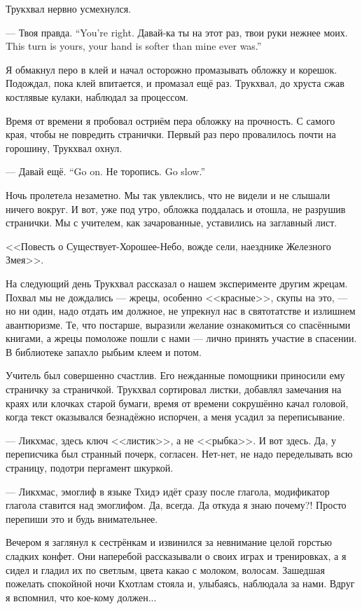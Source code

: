 Трукхвал нервно усмехнулся.

{--- Твоя правда.}
{``You're right.}
{Давай-ка ты на этот раз, твои руки нежнее моих.}
{This turn is yours, your hand is softer than mine ever was.''}

Я обмакнул перо в клей и начал осторожно промазывать обложку и корешок.
Подождал, пока клей впитается, и промазал ещё раз.
Трукхвал, до хруста сжав костлявые кулаки, наблюдал за процессом.

Время от времени я пробовал остриём пера обложку на прочность.
С самого края, чтобы не повредить странички.
Первый раз перо провалилось почти на горошину, Трукхвал охнул.

{--- Давай ещё.}
{``Go on.}
{Не торопись.}
{Go slow.''}

Ночь пролетела незаметно.
Мы так увлеклись, что не видели и не слышали ничего вокруг.
И вот, уже под утро, обложка поддалась и отошла, не разрушив странички.
Мы с учителем, как зачарованные, уставились на заглавный лист.

<<Повесть о Существует-Хорошее-Небо, вожде сели, наезднике Железного Змея>>.

\asterism

На следующий день Трукхвал рассказал о нашем эксперименте другим жрецам.
Похвал мы не дождались --- жрецы, особенно <<красные>>, скупы на это, --- но ни один, надо отдать им должное, не упрекнул нас в святотатстве и излишнем авантюризме.
Те, что постарше, выразили желание ознакомиться со спасёнными книгами, а жрецы помоложе пошли с нами --- лично принять участие в спасении.
В библиотеке запахло рыбьим клеем и потом.

Учитель был совершенно счастлив.
Его нежданные помощники приносили ему страничку за страничкой.
Трукхвал сортировал листки, добавлял замечания на краях или клочках старой бумаги, время от времени сокрушённо качал головой, когда текст оказывался безнадёжно испорчен, а меня усадил за переписывание.

--- Ликхмас, здесь ключ <<листик>>, а не <<рыбка>>.
И вот здесь.
Да, у переписчика был странный почерк, согласен.
Нет-нет, не надо переделывать всю страницу, подотри пергамент шкуркой.

--- Ликхмас, эмоглиф в языке Тхидэ идёт сразу после глагола, модификатор глагола ставится над эмоглифом.
Да, всегда.
Да откуда я знаю почему?!
Просто перепиши это и будь внимательнее.

Вечером я заглянул к сестрёнкам и извинился за невнимание целой горстью сладких конфет.
Они наперебой рассказывали о своих играх и тренировках, а я сидел и гладил их по светлым, цвета какао с молоком, волосам.
Зашедшая пожелать спокойной ночи Кхотлам стояла и, улыбаясь, наблюдала за нами.
Вдруг я вспомнил, что кое-кому должен...

